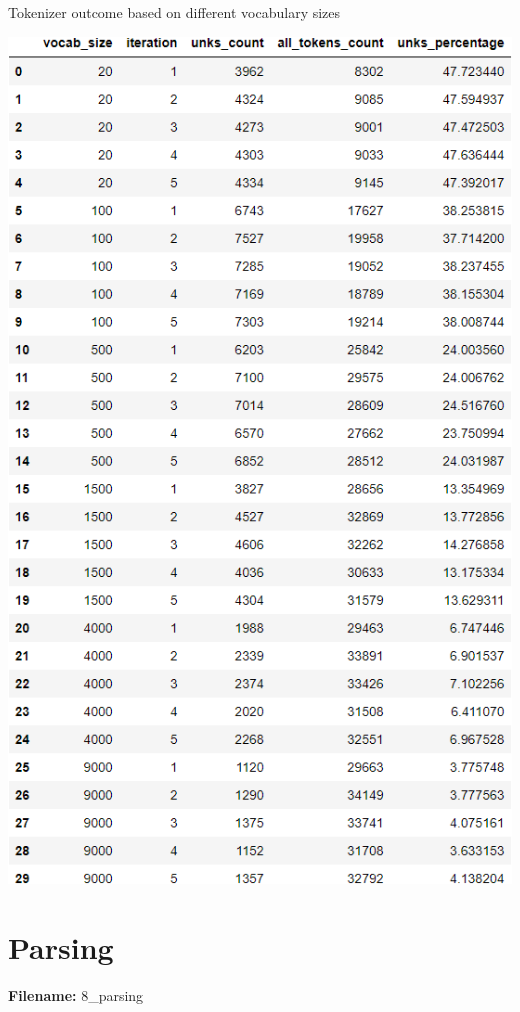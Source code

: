 \documentclass[12pt, a4paper]{article}
\begin{document}
	\begin{table}[H]
		\caption{Tokenizer outcome based on different vocabulary sizes} 
		\centering 
		\vspace{5mm} 
		\includegraphics[width=\linewidth, height=\textheight]{../reports/images/token_vocab-size.png}
		\label{token_vocab-size} 
	\end{table}
	
	
	
	\newpage
	\part{Parsing}
	\large{\textbf{Filename:} 8\_parsing}
\end{document}
